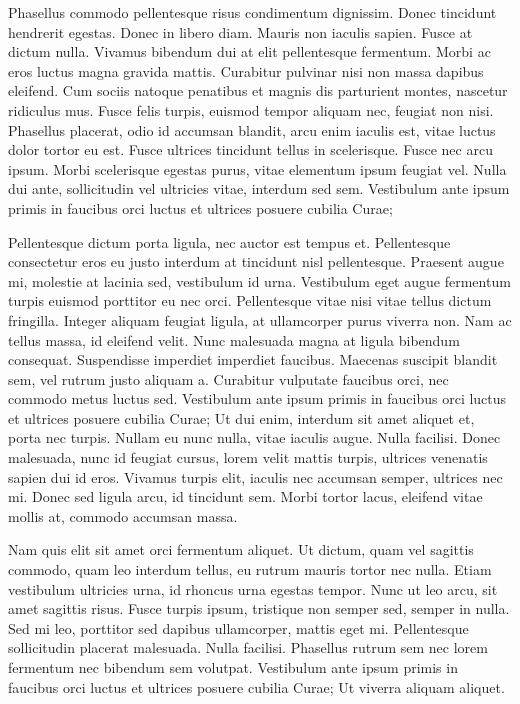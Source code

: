 \documentclass{article}
\begin{document}
Phasellus commodo pellentesque risus condimentum dignissim. Donec tincidunt hendrerit egestas. Donec in libero diam. Mauris non iaculis sapien. Fusce at dictum nulla. Vivamus bibendum dui at elit pellentesque fermentum. Morbi ac eros luctus magna gravida mattis. Curabitur pulvinar nisi non massa dapibus eleifend. Cum sociis natoque penatibus et magnis dis parturient montes, nascetur ridiculus mus. Fusce felis turpis, euismod tempor aliquam nec, feugiat non nisi. Phasellus placerat, odio id accumsan blandit, arcu enim iaculis est, vitae luctus dolor tortor eu est. Fusce ultrices tincidunt tellus in scelerisque. Fusce nec arcu ipsum. Morbi scelerisque egestas purus, vitae elementum ipsum feugiat vel. Nulla dui ante, sollicitudin vel ultricies vitae, interdum sed sem. Vestibulum ante ipsum primis in faucibus orci luctus et ultrices posuere cubilia Curae;

Pellentesque dictum porta ligula, nec auctor est tempus et. Pellentesque consectetur eros eu justo interdum at tincidunt nisl pellentesque. Praesent augue mi, molestie at lacinia sed, vestibulum id urna. Vestibulum eget augue fermentum turpis euismod porttitor eu nec orci. Pellentesque vitae nisi vitae tellus dictum fringilla. Integer aliquam feugiat ligula, at ullamcorper purus viverra non. Nam ac tellus massa, id eleifend velit. Nunc malesuada magna at ligula bibendum consequat. Suspendisse imperdiet imperdiet faucibus. Maecenas suscipit blandit sem, vel rutrum justo aliquam a. Curabitur vulputate faucibus orci, nec commodo metus luctus sed. Vestibulum ante ipsum primis in faucibus orci luctus et ultrices posuere cubilia Curae; Ut dui enim, interdum sit amet aliquet et, porta nec turpis. Nullam eu nunc nulla, vitae iaculis augue. Nulla facilisi. Donec malesuada, nunc id feugiat cursus, lorem velit mattis turpis, ultrices venenatis sapien dui id eros. Vivamus turpis elit, iaculis nec accumsan semper, ultrices nec mi. Donec sed ligula arcu, id tincidunt sem. Morbi tortor lacus, eleifend vitae mollis at, commodo accumsan massa.

Nam quis elit sit amet orci fermentum aliquet. Ut dictum, quam vel sagittis commodo, quam leo interdum tellus, eu rutrum mauris tortor nec nulla. Etiam vestibulum ultricies urna, id rhoncus urna egestas tempor. Nunc ut leo arcu, sit amet sagittis risus. Fusce turpis ipsum, tristique non semper sed, semper in nulla. Sed mi leo, porttitor sed dapibus ullamcorper, mattis eget mi. Pellentesque sollicitudin placerat malesuada. Nulla facilisi. Phasellus rutrum sem nec lorem fermentum nec bibendum sem volutpat. Vestibulum ante ipsum primis in faucibus orci luctus et ultrices posuere cubilia Curae; Ut viverra aliquam aliquet.
\end{document}
